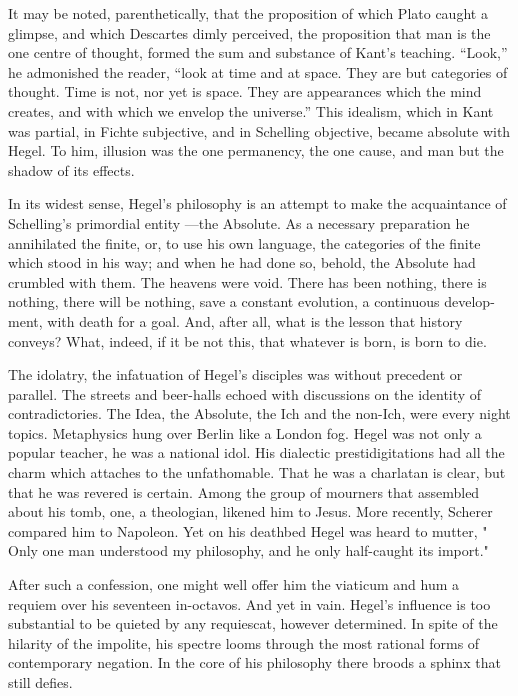 \documentclass[]{book}
\begin{document}
It may be noted, parenthetically, that the proposition of which Plato
caught a glimpse, and which Descartes dimly perceived, the proposition
that man is the one centre of thought, formed the sum and substance of
Kant's teaching. ``Look,'' he admonished the reader, ``look at time and
at space. They are but categories of thought. Time is not, nor yet is
space. They are appearances which the mind creates, and with which we
envelop the universe.'' This idealism, which in Kant was partial, in
Fichte subjective, and in Schelling objective, became absolute with
Hegel. To him, illusion was the one permanency, the one cause, and man
but the shadow of its effects.

In its widest sense, Hegel's philosophy is an attempt to make the
acquaintance of Schelling's primordial entity ---the Absolute. As a
necessary preparation he annihilated the finite, or, to use his own
language, the categories of the finite which stood in his way; and when
he had done so, behold, the Absolute had crumbled with them. The heavens
were void. There has been nothing, there is nothing, there will be
nothing, save a constant evolution, a continuous develop- ment, with
death for a goal. And, after all, what is the lesson that history
conveys? What, indeed, if it be not this, that whatever is born, is born
to die.

The idolatry, the infatuation of Hegel's disciples was without precedent
or parallel. The streets and beer-halls echoed with discussions on the
identity of contradictories. The Idea, the Absolute, the Ich and the
non-Ich, were every night topics. Metaphysics hung over Berlin like a
London fog. Hegel was not only a popular teacher, he was a national
idol. His dialectic prestidigitations had all the charm which attaches
to the unfathomable. That he was a charlatan is clear, but that he was
revered is certain. Among the group of mourners that assembled about his
tomb, one, a theologian, likened him to Jesus. More recently, Scherer
compared him to Napoleon. Yet on his deathbed Hegel was heard to mutter,
" Only one man understood my philosophy, and he only half-caught its
import."

After such a confession, one might well offer him the viaticum and hum a
requiem over his seventeen in-octavos. And yet in vain. Hegel's
influence is too substantial to be quieted by any requiescat, however
determined. In spite of the hilarity of the impolite, his spectre looms
through the most rational forms of contemporary negation. In the core of
his philosophy there broods a sphinx that still defies.
\end{document}
